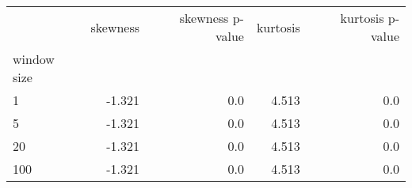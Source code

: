 \begin{tabular}{lrrrr}
\toprule
{} &  skewness &  skewness p-value &  kurtosis &  kurtosis p-value \\
window size &           &                   &           &                   \\
\midrule
1           &    -1.321 &               0.0 &     4.513 &               0.0 \\
5           &    -1.321 &               0.0 &     4.513 &               0.0 \\
20          &    -1.321 &               0.0 &     4.513 &               0.0 \\
100         &    -1.321 &               0.0 &     4.513 &               0.0 \\
\bottomrule
\end{tabular}
